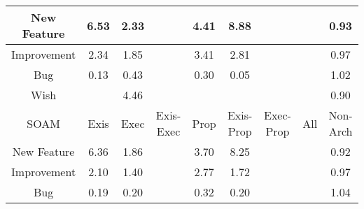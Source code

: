 \begin{tabular}{|c||c|c|c|c|c|c|c|c|}
\hline
New Feature & \cellcolor[rgb]{0.7967238273471452,0.7863428655854897,0.41999999999999993} 6.53 & \cellcolor[rgb]{0.8827100409820692,0.8270731773072959,0.42} 2.33 &  & \cellcolor[rgb]{0.8401381375716344,0.8069075388497216,0.42} 4.41 & \cellcolor[rgb]{0.7486734414334227,0.7635821564684634,0.42} 8.88 &  &  & \cellcolor[rgb]{0.899004976809215,0.7879568902302841,0.4097379783552673} 0.93 \\ 
\hline
Improvement & \cellcolor[rgb]{0.882547114290447,0.8269960015060012,0.42} 2.34 & \cellcolor[rgb]{0.8925524759613723,0.8317353833501236,0.42} 1.85 &  & \cellcolor[rgb]{0.8606594096674939,0.8166281414214444,0.42} 3.41 & \cellcolor[rgb]{0.8728768999634957,0.822415373666919,0.42} 2.81 &  &  & \cellcolor[rgb]{0.9046303235370411,0.8145835314086608,0.4149883019679049} 0.97 \\ 
\hline
Bug & \cellcolor[rgb]{0.7764428627080142,0.2078295501512675,0.2953466718608133} 0.13 & \cellcolor[rgb]{0.822843946360474,0.4274613461062433,0.3386543499364424} 0.43 &  & \cellcolor[rgb]{0.8014220082802577,0.3260641725265528,0.3186605410615738} 0.30 & \cellcolor[rgb]{0.7640241738481591,0.14904775621461974,0.2837558955916152} 0.05 &  &  & \cellcolor[rgb]{0.9095824231674685,0.8398022004477482,0.42} 1.02 \\ 
\hline
Wish &  & \cellcolor[rgb]{0.8391359919986695,0.8064328383151593,0.42000000000000004} 4.46 &  &  &  &  &  & \cellcolor[rgb]{0.8945911136868248,0.7670646047843036,0.4056183727743697} 0.90 \\ 
\hline
\hline
SOAM & Exis & Exec & Exis-Exec & Prop & Exis-Prop & Exec-Prop & All & Non-Arch \\ 
\hline
New Feature & \cellcolor[rgb]{0.8002008865856425,0.7879898936458305,0.41999999999999993} 6.36 & \cellcolor[rgb]{0.8923417621335831,0.8316355715369603,0.42} 1.86 &  & \cellcolor[rgb]{0.8546822386788815,0.8137968499005228,0.42} 3.70 & \cellcolor[rgb]{0.7615670885699201,0.76968967353312,0.42} 8.25 &  &  & \cellcolor[rgb]{0.8980904146232599,0.7836279625500967,0.4088843869817092} 0.92 \\ 
\hline
Improvement & \cellcolor[rgb]{0.8873900559259528,0.8292900264912408,0.42} 2.10 & \cellcolor[rgb]{0.9017156527319513,0.8360758355046085,0.42} 1.40 &  & \cellcolor[rgb]{0.8737555907465272,0.822831595616776,0.42} 2.77 & \cellcolor[rgb]{0.8953166893466774,0.8330447475852681,0.41999999999999993} 1.72 &  &  & \cellcolor[rgb]{0.9056893553908661,0.8195962821834331,0.41597673169814176} 0.97 \\ 
\hline
Bug & \cellcolor[rgb]{0.784948126701225,0.24808779971913197,0.30328491825447673} 0.19 & \cellcolor[rgb]{0.7869846265152237,0.2577272321720588,0.3051856514142088} 0.20 &  & \cellcolor[rgb]{0.8049400058847118,0.34271602785430283,0.32194400549239777} 0.32 & \cellcolor[rgb]{0.7859879788241877,0.2530097664344885,0.3042554469025752} 0.20 &  &  & \cellcolor[rgb]{0.9092149867649314,0.8396281516254938,0.42} 1.04 \\ 

\end{tabular}
